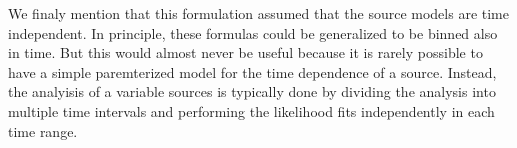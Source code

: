 We finaly mention that this formulation assumed that the source models
are time independent.  In principle, these formulas could be generalized
to be binned also in time. But this would almost never be useful because
it is rarely possible to have a simple paremterized model for the time
dependence of a source. Instead, the analyisis of a variable sources
is typically done by dividing the analysis into multiple time intervals
and performing the likelihood fits independently in each time range.


